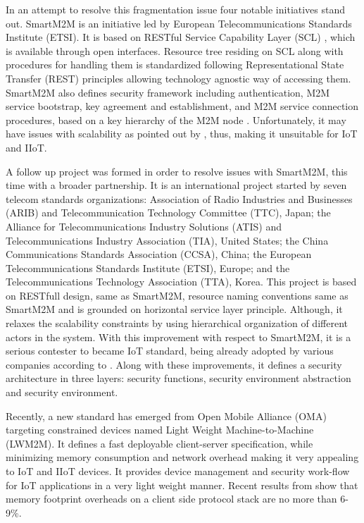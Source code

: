 In an attempt to resolve this fragmentation issue four notable initiatives stand out. SmartM2M is an initiative led by European Telecommunications Standards Institute (ETSI). It is based on RESTful Service Capability Layer (SCL) \cite{Alaya2014}, which is available through open interfaces. Resource tree residing on SCL along with procedures for handling them is standardized following Representational State Transfer (REST) principles allowing technology agnostic way of accessing them. SmartM2M also defines security framework including  authentication, M2M service bootstrap, key agreement and establishment, and M2M service connection procedures, based on a key hierarchy of the M2M node \cite{ETSI1}. Unfortunately, it may have issues with scalability as pointed out by \cite{Grieco2014}, thus, making it unsuitable for IoT and IIoT. 

A follow up project was formed in order to resolve issues with SmartM2M, this time with a broader partnership. It is an international project started by seven telecom standards organizations: Association of Radio Industries and Businesses (ARIB) and Telecommunication Technology Committee (TTC), Japan; the Alliance for Telecommunications Industry Solutions (ATIS) and Telecommunications Industry Association (TIA), United States; the China Communications Standards Association (CCSA), China; the European Telecommunications Standards Institute (ETSI), Europe; and the Telecommunications Technology Association (TTA), Korea. This project is based on RESTfull design, same as SmartM2M, resource naming conventions same as SmartM2M and is grounded on horizontal service layer principle. Although, it relaxes the scalability constraints by using hierarchical organization of different actors in the system. With this improvement with respect to SmartM2M, it is a serious contester to became IoT standard, being already adopted by various companies according to \cite{Park2016}. Along with these improvements, it defines a security architecture in three layers: security functions, security environment abstraction and security environment.

Recently, a new standard has emerged from Open Mobile Alliance (OMA) targeting constrained devices named Light Weight Machine-to-Machine (LWM2M). It defines a fast deployable client-server specification, while minimizing memory consumption and network overhead making it very appealing to IoT and IIoT devices. It provides device management and security work-flow for IoT applications in a very light weight manner. Recent results from \cite{Rao2015} show that memory footprint overheads on a client side protocol stack are no more than 6-9\%. 

